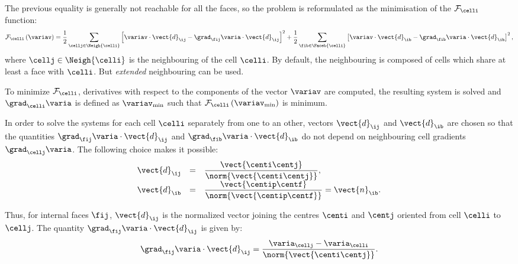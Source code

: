 The previous equality is generally not reachable for all the faces, so the 
problem is reformulated as the minimisation of the $\mathcal{F}_\celli$ function: 
%
\begin{equation}\label{eq:spadis:gradmc_function}
\mathcal{F}_\celli
\left( \variav \right) =
\dfrac{1}{2}\sum\limits_{\cellj \in \Neigh{\celli}  }\left[
 \variav   \cdot \vect{d}_\ij  -  \grad_{\fij} \varia   \cdot \vect{d}_\ij 
\right]^2+
\dfrac{1}{2}\sum\limits_{ \fib \in \Faceb{\celli}}\left[
 \variav   \cdot \vect{d}_\ib  -  \grad_{\fib} \varia   \cdot \vect{d}_\ib
\right]^2,
\end{equation}
where $\cellj \in \Neigh{\celli} $ is the neighbouring of the cell $\celli$. By default, the neighbouring is composed of
cells which share at least a face with $\celli$. But \emph{extended} neighbouring can be used. 

To minimize $\mathcal{F}_\celli$, derivatives with respect to the components of the 
vector $\variav  $ are computed, the resulting system is solved and $\grad_\celli \varia$ is defined 
as $\variav_{\min}$ such that $\mathcal{F}_\celli \left( \variav_{\min}\right)$ is minimum.

In order to solve the systems for each cell $\celli$ separately from one to an other,
vectors $\vect{d}_\ij$ and $\vect{d}_\ib$ are chosen so that the quantities 
$\grad_{\fij} \varia   \cdot \vect{d}_\ij $ and $\grad_{\fib} \varia   \cdot \vect{d}_\ib $
do not depend on neighbouring  cell gradients  $\grad_{\cellj} \varia $.
The following choice makes it possible:
\begin{equation}\label{eq:spadis:gradmc_scalar_d_choice}
\begin{array}{r c l}
\vect{d}_\ij &=& \dfrac{\vect{\centi \centj}}{\norm{\vect{\centi \centj}}}, \\
\vect{d}_\ib &=& \dfrac{\vect{\centip \centf}}{\norm{\vect{\centip \centf}}}= \vect{n}_\ib .
\end{array}
\end{equation}

Thus, for internal faces $\fij$, $\vect{d}_\ij$ is the normalized vector joining 
the centres $\centi$ and $\centj$ oriented from cell $\celli$ to $\cellj$.
The quantity  $\grad_{\fij} \varia   \cdot \vect{d}_\ij$ is given by:
\begin{equation}
\grad_{\fij} \varia   \cdot \vect{d}_\ij =\dfrac{\varia_\cellj - \varia_\celli }{\norm{\vect{\centi \centj}}}.
\end{equation}

